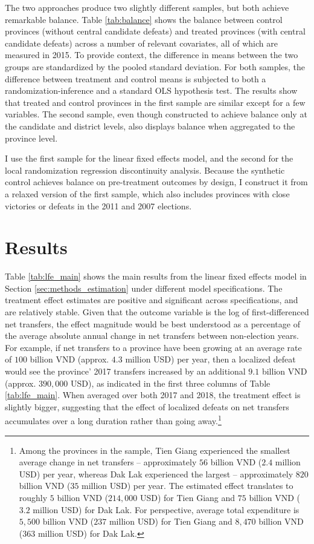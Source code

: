 \documentclass[12pt]{article}
\newcommand\fnote[1]{\footnote{\baselineskip=2\normalbaselineskip#1}}
\newcommand{\1}{\mathbbm{1}}
\begin{document}
The two approaches produce two slightly different samples, but both achieve remarkable balance. Table \ref{tab:balance} shows the balance between control provinces (without central candidate defeats) and treated provinces (with central candidate defeats) across a number of relevant covariates, all of which are measured in 2015. To provide context, the difference in means between the two groups are standardized by the pooled standard deviation. For both samples, the difference between treatment and control means is subjected to both a randomization-inference and a standard OLS hypothesis test. The results show that treated and control provinces in the first sample are similar except for a few variables. The second sample, even though constructed to achieve balance only at the candidate and district levels, also displays balance when aggregated to the province level. 

I use the first sample for the linear fixed effects model, and the second for the local randomization regression discontinuity analysis. Because the synthetic control achieves balance on pre-treatment outcomes by design, I construct it from a relaxed version of the first sample, which also includes provinces with close victories or defeats in the 2011 and 2007 elections.



\section{Results}
\label{sec:results}


Table \ref{tab:lfe_main} shows the main results from the linear fixed effects model in Section \ref{sec:methods_estimation} under different model specifications. The treatment effect estimates are positive and significant across specifications, and are relatively stable. Given that the outcome variable is the log of first-differenced net transfers, the effect magnitude would be best understood as a percentage of the average absolute annual change in net transfers between non-election years. For example, if net transfers to a province have been growing at an average rate of $100$ billion VND (approx. $4.3$ million USD) per year, then a localized defeat would see the province' 2017 transfers increased by an additional $9.1$ billion VND (approx. $390,000$ USD), as indicated in the first three columns of Table \ref{tab:lfe_main}. When averaged over both 2017 and 2018, the treatment effect is slightly bigger, suggesting that the effect of localized defeats on net transfers accumulates over a long duration rather than going away.\fnote{Among the provinces in the sample, Tien Giang experienced the smallest average change in net transfers -- approximately $56$ billion VND ($2.4$ million USD) per year, whereas Dak Lak experienced the largest -- approximately $820$ billion VND ($35$ million USD) per year. The estimated effect translates to roughly $5$ billion VND ($214,000$ USD) for Tien Giang and $75$ billion VND ($3.2$ million USD) for Dak Lak. For perspective, average total expenditure is $5,500$ billion VND ($237$ million USD) for Tien Giang and $8,470$ billion VND ($363$ million USD) for Dak Lak.}
\end{document}
